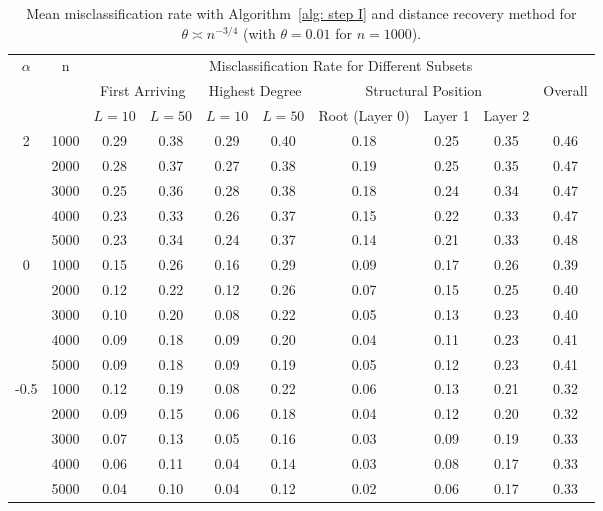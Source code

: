 \begin{table}[tbp]
\setlength{\tabcolsep}{3.5pt}

\centering

{
\begin{tabular}{c|c|cc|cc|ccc|c}
\hline
\hline
\multirow{3}{*}{$\alpha$} & \multirow{3}{*}{n}
& \multicolumn{8}{c}{Misclassification Rate for Different Subsets} \\
\cline{3-10}
& 
& \multicolumn{2}{c|}{First Arriving}
& \multicolumn{2}{c|}{Highest Degree}
& \multicolumn{3}{c|}{Structural Position}
& \multirow{2}{*}{Overall} \\
\cline{3-9}
& 
& $L=10$ & $L=50$
& $L=10$ & $L=50$
& Root (Layer 0) & Layer 1 & Layer 2
& \\
\hline
\multirow{5}{*}{2}
& 1000 & 0.29 & 0.38 & 0.29 & 0.40 & 0.18 & 0.25 & 0.35 & 0.46 \\
& 2000 & 0.28 & 0.37 & 0.27 & 0.38 & 0.19 & 0.25 & 0.35 & 0.47 \\
& 3000 & 0.25 & 0.36 & 0.28 & 0.38 & 0.18 & 0.24 & 0.34 & 0.47 \\
& 4000 & 0.23 & 0.33 & 0.26 & 0.37 & 0.15 & 0.22 & 0.33 & 0.47 \\
& 5000 & 0.23 & 0.34 & 0.24 & 0.37 & 0.14 & 0.21 & 0.33 & 0.48 \\
\hline
\multirow{5}{*}{0}
& 1000 & 0.15 & 0.26 & 0.16 & 0.29 & 0.09 & 0.17 & 0.26 & 0.39 \\
& 2000 & 0.12 & 0.22 & 0.12 & 0.26 & 0.07 & 0.15 & 0.25 & 0.40 \\
& 3000 & 0.10 & 0.20 & 0.08 & 0.22 & 0.05 & 0.13 & 0.23 & 0.40 \\
& 4000 & 0.09 & 0.18 & 0.09 & 0.20 & 0.04 & 0.11 & 0.23 & 0.41 \\
& 5000 & 0.09 & 0.18 & 0.09 & 0.19 & 0.05 & 0.12 & 0.23 & 0.41 \\
\hline
\multirow{5}{*}{-0.5}
& 1000 & 0.12 & 0.19 & 0.08 & 0.22 & 0.06 & 0.13 & 0.21 & 0.32 \\
& 2000 & 0.09 & 0.15 & 0.06 & 0.18 & 0.04 & 0.12 & 0.20 & 0.32 \\
& 3000 & 0.07 & 0.13 & 0.05 & 0.16 & 0.03 & 0.09 & 0.19 & 0.33 \\
& 4000 & 0.06 & 0.11 & 0.04 & 0.14 & 0.03 & 0.08 & 0.17 & 0.33 \\
& 5000 & 0.04 & 0.10 & 0.04 & 0.12 & 0.02 & 0.06 & 0.17 & 0.33 \\
\hline
\hline
\end{tabular}
}


\caption{Mean misclassification rate with Algorithm~\ref{alg: step I} and distance recovery method for $\theta \asymp n^{-3/4}$ (with $\theta=0.01$ for $n=1000$).}
\label{tab:mean_error_scale_n34}
\end{table}